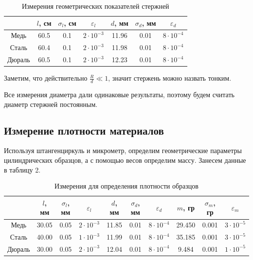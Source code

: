 \documentclass[a4paper, 12pt]{article}
\begin{document}
    \begin{table}[h]
        \centering
        \begin{tabular}{|c|c|c|c|c|c|c|}
            \hline
             &
              \multicolumn{1}{c|}{$l$, см} &
              \multicolumn{1}{c|}{$\sigma_l$, см} &
              \multicolumn{1}{c|}{$\varepsilon_l$} &
              \multicolumn{1}{c|}{$d$, мм} &
              \multicolumn{1}{c|}{$\sigma_d$, мм} &
              \multicolumn{1}{c|}{$\varepsilon_d$} \\ \hline
            Медь   & 60.5 & 0.1 & $2 \cdot 10^{-3}$ & 11.96 & 0.01 & $8 \cdot 10^{-4}$ \\ \hline
            Сталь  & 60.4 & 0.1 & $2 \cdot 10^{-3}$ & 11.98 & 0.01 & $8 \cdot 10^{-4}$ \\ \hline
            Дюраль & 60.5 & 0.1 & $2 \cdot 10^{-3}$ & 12.23 & 0.01 & $8 \cdot 10^{-4}$ \\ \hline
        \end{tabular}
        \caption{Измерения геометрических показателей стержней}
    \end{table}

    Заметим, что действительно $\frac{R}{d} \ll 1$, значит стержень можно назвать тонким.
    
    Все измерения диаметра дали одинаковые результаты, поэтому будем считать диаметр стержней постоянным.

    \subsection{Измерение плотности материалов}

    Используя штангенциркуль и микрометр, определим геометрические параметры цилиндрических образцов, а с помощью весов определим массу. Занесем данные в таблицу 2.

    \begin{table}[h]
        \centering
        \begin{tabular}{|c|c|c|c|c|c|c|c|c|c|}
        \hline
         & $l$, мм & $\sigma_l$, мм & $\varepsilon_l$ & $d$, мм & $\sigma_d$, мм & $\varepsilon_d$ & $m$, гр & $\sigma_m$, гр & $\varepsilon_m$ \\ \hline
        Медь   & 30.05 & 0.05 & $2 \cdot 10^{-3}$ & 11.85 & 0.01 & $8\cdot 10^{-4}$ & 29.450 & 0.001 & $3\cdot 10^{-5}$ \\ \hline
        Сталь  & 40.00 & 0.05 & $1 \cdot 10^{-3}$ & 11.99 & 0.01 & $8\cdot 10^{-4}$ & 35.185 & 0.001 & $3\cdot 10^{-5}$ \\ \hline
        Дюраль & 30.00 & 0.05 & $2 \cdot 10^{-3}$ & 12.04 & 0.01 & $8\cdot 10^{-4}$ &  9.484 & 0.001 & $1\cdot 10^{-5}$ \\ \hline
        \end{tabular}
        \caption{Измерения для определения плотности образцов}
    \end{table}
\end{document}
